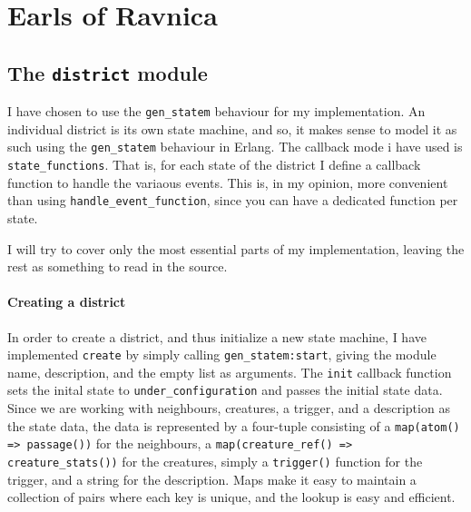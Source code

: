 \newpage
\section*{Earls of Ravnica}

\subsection*{The \texttt{district} module}

I have chosen to use the \texttt{gen\_statem} behaviour for my implementation. An individual district is its own state machine, and so, it makes sense to model it as such using the \texttt{gen\_statem} behaviour in Erlang. The callback mode i have used is \texttt{state\_functions}. That is, for each state of the district I define a callback function to handle the variaous events. This is, in my opinion, more convenient than using \texttt{handle\_event\_function}, since you can have a dedicated function per state.

I will try to cover only the most essential parts of my implementation, leaving the rest as something to read in the source.

\paragraph{Creating a district} In order to create a district, and thus initialize a new state machine, I have implemented \texttt{create} by simply calling \texttt{gen\_statem:start}, giving the module name, description, and the empty list as arguments. The \texttt{init} callback function sets the inital state to \texttt{under\_configuration} and passes the initial state data. Since we are working with neighbours, creatures, a trigger, and a description as the state data, the data is represented by a four-tuple consisting of a \texttt{map(atom() => passage())}  for the neighbours, a \texttt{map(creature\_ref() => creature\_stats())} for the creatures, simply a \texttt{trigger()} function for the trigger, and a string for the description. Maps make it easy to maintain a collection of pairs where each key is unique, and the lookup is easy and efficient.


